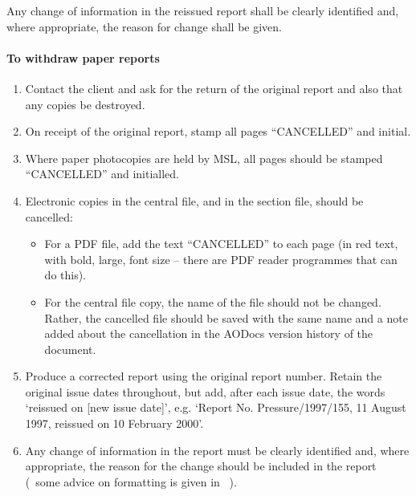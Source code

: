 Any change of information in the reissued report shall be clearly identified and, where appropriate, the reason for change shall be given.

\paragraph{To withdraw paper reports}
\begin{enumerate}
\item Contact the client and ask for the return of the original report and also that any copies be destroyed. 

\item On receipt of the original report, stamp all pages ``{\color{red}CANCELLED}” and initial. 

\item Where paper photocopies are held by MSL, all pages should be stamped ``{\color{red}CANCELLED}” and initialled.

\item Electronic copies in the central file, and in the section file, should be cancelled:
\begin{itemize}
\item For a PDF file, add the text “{\color{red}CANCELLED}” to each page (in red text, with bold, large, font size – there are PDF reader programmes that can do this). 
\item For the central file copy, the name of the file should not be changed. Rather, the cancelled file should be saved with the same name and a note added about the cancellation in the AODocs version history of the document. 
\end{itemize}

\item Produce a corrected report using the original report number.  Retain the original issue dates throughout, but add, after each issue date, the words `reissued on [new issue date]', e.g. `Report No. Pressure/1997/155, 11 August 1997, reissued on 10 February 2000'.

\item Any change of information in the report must be clearly identified and, where appropriate, the reason for the change should be included in the report (~some advice on formatting is given in \cite[\S\ref*{GRP-ss:reissued_reports}]{MSL_Reporting_Guidelines}~).


\end{enumerate}
